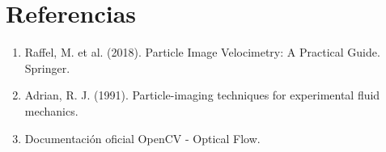 \documentclass[11pt, a4paper]{article}
\begin{document}
\section{Referencias}
\begin{enumerate}
    \item Raffel, M. et al. (2018). Particle Image Velocimetry: A Practical Guide. Springer.
    \item Adrian, R. J. (1991). Particle-imaging techniques for experimental fluid mechanics.
    \item Documentación oficial OpenCV - Optical Flow.
\end{enumerate}
\end{document}
